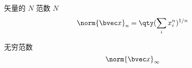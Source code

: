 
矢量的 $N$ 范数 $N$
\begin{equation}
\norm{\bvec x}_n = \qty(\sum_i x_i^n)^{1/n}
\end{equation}

无穷范数
\begin{equation}
\norm{\bvec x}_\infty
\end{equation}
